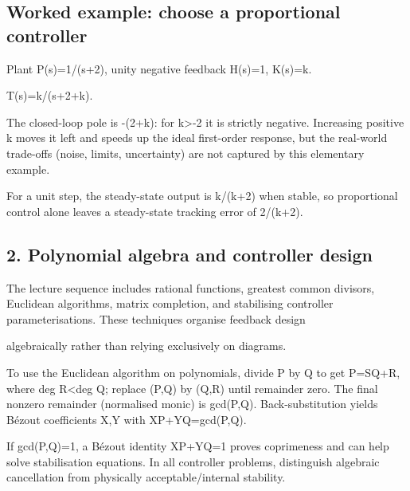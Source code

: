 \documentclass[11pt,a4paper]{article}
\begin{document}
\subsection{Worked example: choose a proportional controller}
\begin{equationbox}\raggedright
{\ttfamily\small Plant P(s)=1/(s+2), unity negative feedback H(s)=1, K(s)=k.}\par
\end{equationbox}
\begin{equationbox}\raggedright
{\ttfamily\small T(s)=k/(s+2+k).}\par
\end{equationbox}
\begin{conceptbox}The closed-loop pole is -(2+k): for k>-2 it is strictly negative. Increasing positive k moves it left and speeds up the ideal first-order response, but the real-world trade-offs (noise, limits, uncertainty) are not captured by this elementary example.\end{conceptbox}
\begin{conceptbox}For a unit step, the steady-state output is k/(k+2) when stable, so proportional control alone leaves a steady-state tracking error of 2/(k+2).\end{conceptbox}

\subsection{2. Polynomial algebra and controller design}
\begin{conceptbox}The lecture sequence includes rational functions, greatest common divisors, Euclidean algorithms, matrix completion, and stabilising controller parameterisations. These techniques organise feedback design\end{conceptbox}
\begin{conceptbox}algebraically rather than relying exclusively on diagrams.\end{conceptbox}
\begin{conceptbox}To use the Euclidean algorithm on polynomials, divide P by Q to get P=SQ+R, where deg R<deg Q; replace (P,Q) by (Q,R) until remainder zero. The final nonzero remainder (normalised monic) is gcd(P,Q). Back-substitution yields Bézout coefficients X,Y with XP+YQ=gcd(P,Q).\end{conceptbox}
\begin{conceptbox}If gcd(P,Q)=1, a Bézout identity XP+YQ=1 proves coprimeness and can help solve stabilisation equations. In all controller problems, distinguish algebraic cancellation from physically acceptable/internal stability.\end{conceptbox}
\end{document}
